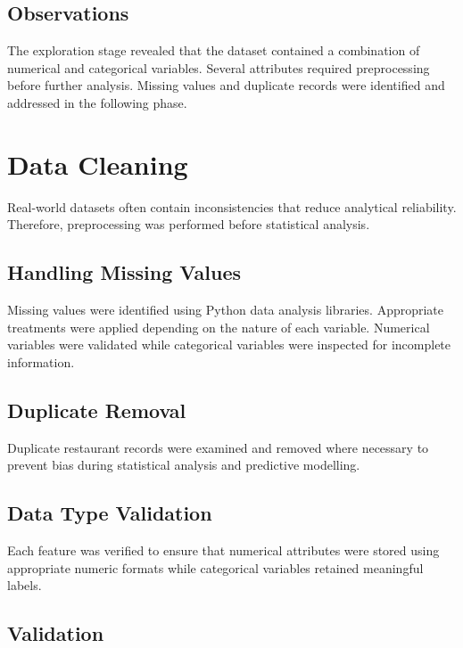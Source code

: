 \documentclass[12pt,a4paper]{report}
\begin{document}
\subsection{Observations}

The exploration stage revealed that the dataset contained a combination of numerical and categorical variables. Several attributes required preprocessing before further analysis. Missing values and duplicate records were identified and addressed in the following phase.

\section{Data Cleaning}

Real-world datasets often contain inconsistencies that reduce analytical reliability. Therefore, preprocessing was performed before statistical analysis.

\subsection{Handling Missing Values}

Missing values were identified using Python data analysis libraries. Appropriate treatments were applied depending on the nature of each variable. Numerical variables were validated while categorical variables were inspected for incomplete information.

\subsection{Duplicate Removal}

Duplicate restaurant records were examined and removed where necessary to prevent bias during statistical analysis and predictive modelling.

\subsection{Data Type Validation}

Each feature was verified to ensure that numerical attributes were stored using appropriate numeric formats while categorical variables retained meaningful labels.

\subsection{Validation}
\end{document}

